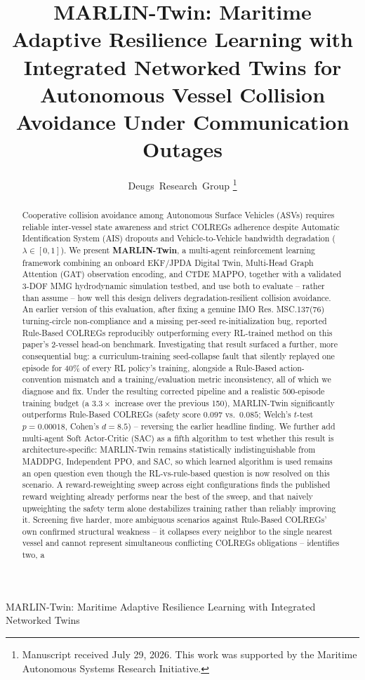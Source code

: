 \documentclass[journal,twocolumn,10pt]{IEEEtran}
\begin{document}
\title{MARLIN-Twin: Maritime Adaptive Resilience Learning with Integrated Networked Twins for Autonomous Vessel Collision Avoidance Under Communication Outages}

\author{Deugs~Research~Group
\thanks{Manuscript received July 29, 2026. This work was supported by the Maritime Autonomous Systems Research Initiative.}
}

%
{MARLIN-Twin: Maritime Adaptive Resilience Learning with Integrated Networked Twins}

\maketitle

\begin{abstract}
Cooperative collision avoidance among Autonomous Surface Vehicles (ASVs) requires reliable inter-vessel state awareness and strict COLREGs adherence despite Automatic Identification System (AIS) dropouts and Vehicle-to-Vehicle bandwidth degradation ($\lambda \in [0,1]$). We present \textbf{MARLIN-Twin}, a multi-agent reinforcement learning framework combining an onboard EKF/JPDA Digital Twin, Multi-Head Graph Attention (GAT) observation encoding, and CTDE MAPPO, together with a validated 3-DOF MMG hydrodynamic simulation testbed, and use both to evaluate -- rather than assume -- how well this design delivers degradation-resilient collision avoidance. An earlier version of this evaluation, after fixing a genuine IMO Res. MSC.137(76) turning-circle non-compliance and a missing per-seed re-initialization bug, reported Rule-Based COLREGs reproducibly outperforming every RL-trained method on this paper's 2-vessel head-on benchmark. Investigating that result surfaced a further, more consequential bug: a curriculum-training seed-collapse fault that silently replayed one episode for 40\% of every RL policy's training, alongside a Rule-Based action-convention mismatch and a training/evaluation metric inconsistency, all of which we diagnose and fix. Under the resulting corrected pipeline and a realistic 500-episode training budget (a $3.3\times$ increase over the previous 150), MARLIN-Twin significantly outperforms Rule-Based COLREGs (safety score $0.097$ vs.\ $0.085$; Welch's $t$-test $p=0.00018$, Cohen's $d=8.5$) -- reversing the earlier headline finding. We further add multi-agent Soft Actor-Critic (SAC) as a fifth algorithm to test whether this result is architecture-specific: MARLIN-Twin remains statistically indistinguishable from MADDPG, Independent PPO, and SAC, so which learned algorithm is used remains an open question even though the RL-vs-rule-based question is now resolved on this scenario. A reward-reweighting sweep across eight configurations finds the published reward weighting already performs near the best of the sweep, and that naively upweighting the safety term alone destabilizes training rather than reliably improving it. Screening five harder, more ambiguous scenarios against Rule-Based COLREGs' own confirmed structural weakness -- it collapses every neighbor to the single nearest vessel and cannot represent simultaneous conflicting COLREGs obligations -- identifies two, a 
\end{abstract}
\end{document}
